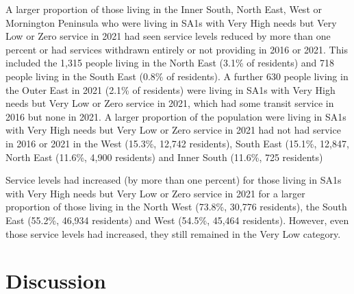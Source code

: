 \documentclass[preprint, 3p,
authoryear]{elsarticle} %
\begin{document}
A larger proportion of those living in the Inner South, North East, West
or Mornington Peninsula who were living in SA1s with Very High needs but
Very Low or Zero service in 2021 had seen service levels reduced by more
than one percent or had services withdrawn entirely or not providing in
2016 or 2021. This included the 1,315 people living in the North East
(3.1\% of residents) and 718 people living in the South East (0.8\% of
residents). A further 630 people living in the Outer East in 2021 (2.1\%
of residents) were living in SA1s with Very High needs but Very Low or
Zero service in 2021, which had some transit service in 2016 but none in
2021. A larger proportion of the population were living in SA1s with
Very High needs but Very Low or Zero service in 2021 had not had service
in 2016 or 2021 in the West (15.3\%, 12,742 residents), South East
(15.1\%, 12,847, North East (11.6\%, 4,900 residents) and Inner South
(11.6\%, 725 residents)

Service levels had increased (by more than one percent) for those living
in SA1s with Very High needs but Very Low or Zero service in 2021 for a
larger proportion of those living in the North West (73.8\%, 30,776
residents), the South East (55.2\%, 46,934 residents) and West (54.5\%,
45,464 residents). However, even those service levels had increased,
they still remained in the Very Low category.

\section{Discussion}\label{discussion}
\end{document}

